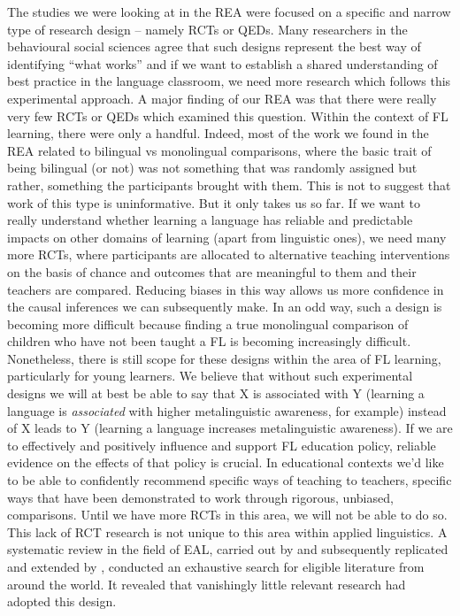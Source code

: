 \documentclass[output=paper]{langscibook}
\begin{document}
The studies we were looking at in the REA were focused on a specific and narrow type of research design -- namely RCTs or QEDs. Many researchers in the behavioural social sciences agree that such designs represent the best way of identifying ``what works'' and if we want to establish a shared understanding of best practice in the language classroom, we need more research which follows this experimental approach. A major finding of our REA was that there were really very few RCTs or QEDs which examined this question. Within the context of FL learning, there were only a handful. Indeed, most of the work we found in the REA related to bilingual vs monolingual comparisons, where the basic trait of being bilingual (or not) was not something that was randomly assigned but rather, something the participants brought with them. This is not to suggest that work of this type is uninformative. But it only takes us so far. If we want to really understand whether learning a language has reliable and predictable impacts on other domains of learning (apart from linguistic ones), we need many more RCTs, where participants are allocated to alternative teaching interventions on the basis of chance and outcomes that are meaningful to them and their teachers are compared. Reducing biases in this way allows us more confidence in the causal inferences we can subsequently make. In an odd way, such a design is becoming more difficult because finding a true monolingual comparison of children who have not been taught a FL is becoming increasingly difficult. Nonetheless, there is still scope for these designs within the area of FL learning, particularly for young learners. We believe that without such experimental designs we will at best be able to say that X is associated with Y (learning a language is \textit{associated} with higher metalinguistic awareness, for example) instead of X leads to Y (learning a language increases metalinguistic awareness). If we are to effectively and positively influence and support FL education policy, reliable evidence on the effects of that policy is crucial. In educational contexts we’d like to be able to confidently recommend specific ways of teaching to teachers, specific ways that have been demonstrated to work through rigorous, unbiased, comparisons. Until we have more RCTs in this area, we will not be able to do so. This lack of RCT research is not unique to this area within applied linguistics. A systematic review in the field of EAL, carried out by \citet{MurphyUnthiah2015} and subsequently replicated and extended by \citet{OxleyDeCat2019}, conducted an exhaustive search for eligible literature from around the world. It revealed that vanishingly little relevant research had adopted this design. 
\end{document}

